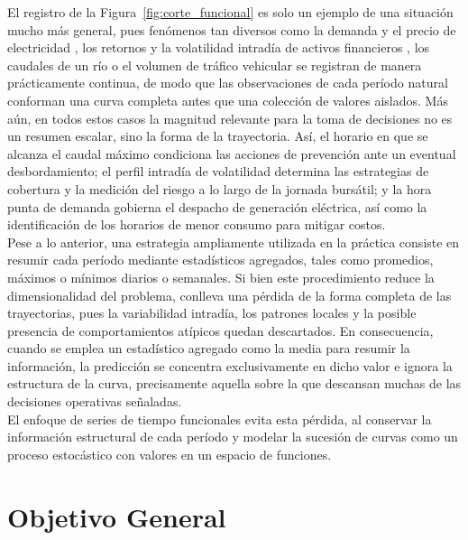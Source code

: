 El registro de la Figura~\ref{fig:corte_funcional} es solo un ejemplo de una situación mucho más general, pues fenómenos tan diversos como la demanda y el precio de electricidad \citep{01_01_shang2013electricity,01_01_shah2020electricity}, los retornos y la volatilidad intradía de activos financieros \citep{01_01_shang2017intraday,01_01_wang2025crudeoil}, los caudales de un río \citep{01_01_beyaztas2021riverflow} o el volumen de tráfico vehicular \citep{01_01_wagnermuns2018traffic} se registran de manera prácticamente continua, de modo que las observaciones de cada período natural conforman una curva completa antes que una colección de valores aislados. Más aún, en todos estos casos la magnitud relevante para la toma de decisiones no es un resumen escalar, sino la forma de la trayectoria. Así, el horario en que se alcanza el caudal máximo condiciona las acciones de prevención ante un eventual desbordamiento; el perfil intradía de volatilidad determina las estrategias de cobertura y la medición del riesgo a lo largo de la jornada bursátil; y la hora punta de demanda gobierna el despacho de generación eléctrica, así como la identificación de los horarios de menor consumo para mitigar costos.\\
 
Pese a lo anterior, una estrategia ampliamente utilizada en la práctica consiste en resumir cada período mediante estadísticos agregados, tales como promedios, máximos o mínimos diarios o semanales. Si bien este procedimiento reduce la dimensionalidad del problema, conlleva una pérdida de la forma completa de las trayectorias, pues la variabilidad intradía, los patrones locales y la posible presencia de comportamientos atípicos quedan descartados. En consecuencia, cuando se emplea un estadístico agregado como la media para resumir la información, la predicción se concentra exclusivamente en dicho valor e ignora la estructura de la curva, precisamente aquella sobre la que descansan muchas de las decisiones operativas señaladas.\\
 
El enfoque de series de tiempo funcionales evita esta pérdida, al conservar la información estructural de cada período y modelar la sucesión de curvas como un proceso estocástico con valores en un espacio de funciones.

\section{Objetivo General}
\label{01_03_00_objetivo_general}

